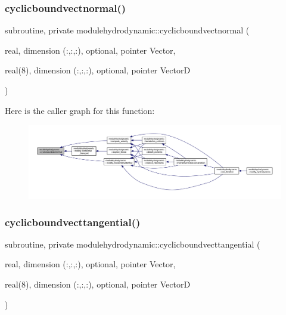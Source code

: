 \subsubsection{\texorpdfstring{cyclicboundvectnormal()}{cyclicboundvectnormal()}}
{\footnotesize\ttfamily subroutine, private modulehydrodynamic\+::cyclicboundvectnormal (\begin{DoxyParamCaption}\item[{real, dimension (\+:,\+:,\+:), optional, pointer}]{Vector,  }\item[{real(8), dimension (\+:,\+:,\+:), optional, pointer}]{VectorD }\end{DoxyParamCaption})\hspace{0.3cm}{\ttfamily [private]}}

Here is the caller graph for this function\+:\nopagebreak
\begin{figure}[H]
\begin{center}
\leavevmode
\includegraphics[width=350pt]{namespacemodulehydrodynamic_ab70188c3f183ae7e6142adec6d3ea9fe_icgraph}
\end{center}
\end{figure}
\mbox{\label{namespacemodulehydrodynamic_a0d8c9bbfb63616e6ad93ba589923c7eb}} 
\subsubsection{\texorpdfstring{cyclicboundvecttangential()}{cyclicboundvecttangential()}}
{\footnotesize\ttfamily subroutine, private modulehydrodynamic\+::cyclicboundvecttangential (\begin{DoxyParamCaption}\item[{real, dimension (\+:,\+:,\+:), optional, pointer}]{Vector,  }\item[{real(8), dimension (\+:,\+:,\+:), optional, pointer}]{VectorD }\end{DoxyParamCaption})\hspace{0.3cm}{\ttfamily [private]}}

